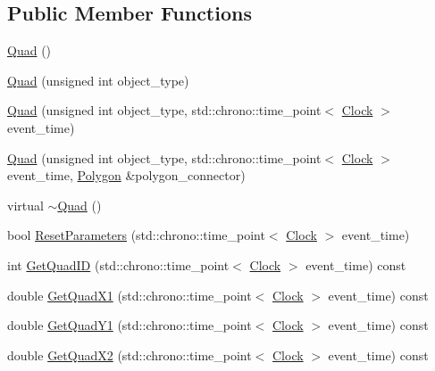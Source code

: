 \subsection*{Public Member Functions}
\begin{DoxyCompactItemize}
\item 
\mbox{\hyperlink{class_quad_ae446d188d645cc5c512336f25d1a697a}{Quad}} ()
\item 
\mbox{\hyperlink{class_quad_a8a0b4e52a52ac35a4a78fac3a0cd36b8}{Quad}} (unsigned int object\+\_\+type)
\item 
\mbox{\hyperlink{class_quad_aa22093808d9a84db2bf826ccacee415e}{Quad}} (unsigned int object\+\_\+type, std\+::chrono\+::time\+\_\+point$<$ \mbox{\hyperlink{universe_8h_a0ef8d951d1ca5ab3cfaf7ab4c7a6fd80}{Clock}} $>$ event\+\_\+time)
\item 
\mbox{\hyperlink{class_quad_a4bb08fd4d953ce61076ed06b51ee2793}{Quad}} (unsigned int object\+\_\+type, std\+::chrono\+::time\+\_\+point$<$ \mbox{\hyperlink{universe_8h_a0ef8d951d1ca5ab3cfaf7ab4c7a6fd80}{Clock}} $>$ event\+\_\+time, \mbox{\hyperlink{class_polygon}{Polygon}} \&polygon\+\_\+connector)
\item 
virtual \mbox{\hyperlink{class_quad_a64a53d5b7a7811c34a85054828f74866}{$\sim$\+Quad}} ()
\item 
bool \mbox{\hyperlink{class_quad_af7c18022d7db1ad20bb7a1e1bd1ffb90}{Reset\+Parameters}} (std\+::chrono\+::time\+\_\+point$<$ \mbox{\hyperlink{universe_8h_a0ef8d951d1ca5ab3cfaf7ab4c7a6fd80}{Clock}} $>$ event\+\_\+time)
\item 
int \mbox{\hyperlink{class_quad_aba78e3b63f568529fcae1cfa6c3c54bf}{Get\+Quad\+ID}} (std\+::chrono\+::time\+\_\+point$<$ \mbox{\hyperlink{universe_8h_a0ef8d951d1ca5ab3cfaf7ab4c7a6fd80}{Clock}} $>$ event\+\_\+time) const
\item 
double \mbox{\hyperlink{class_quad_a7b0e34a18832713528b861f7ed35e139}{Get\+Quad\+X1}} (std\+::chrono\+::time\+\_\+point$<$ \mbox{\hyperlink{universe_8h_a0ef8d951d1ca5ab3cfaf7ab4c7a6fd80}{Clock}} $>$ event\+\_\+time) const
\item 
double \mbox{\hyperlink{class_quad_ac7b0d27994149531dcd81eacca4e1a5c}{Get\+Quad\+Y1}} (std\+::chrono\+::time\+\_\+point$<$ \mbox{\hyperlink{universe_8h_a0ef8d951d1ca5ab3cfaf7ab4c7a6fd80}{Clock}} $>$ event\+\_\+time) const
\item 
double \mbox{\hyperlink{class_quad_a2974623eaf17fe5bef35e8c4638149d6}{Get\+Quad\+X2}} (std\+::chrono\+::time\+\_\+point$<$ \mbox{\hyperlink{universe_8h_a0ef8d951d1ca5ab3cfaf7ab4c7a6fd80}{Clock}} $>$ event\+\_\+time) const

\end{DoxyCompactItemize}
